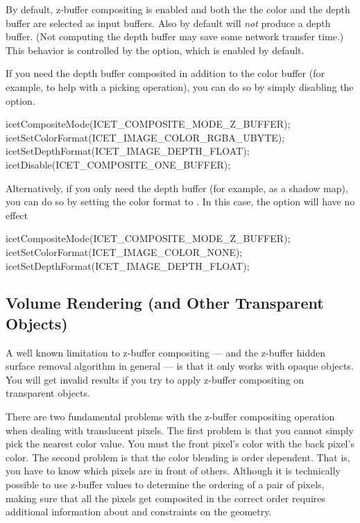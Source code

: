 By default, z-buffer compositing is enabled and both the the color and the
depth buffer are selected as input buffers.  Also by default \IceT will
\emph{not} produce a depth buffer.  (Not computing the depth buffer may
save some network transfer time.)  This behavior is controlled by the
 option, which is enabled by default.

If you need the depth buffer composited in addition to the color buffer
(for example, to help with a picking operation), you can do so by simply
disabling the  option.

\begin{code}
icetCompositeMode(ICET_COMPOSITE_MODE_Z_BUFFER);
icetSetColorFormat(ICET_IMAGE_COLOR_RGBA_UBYTE);
icetSetDepthFormat(ICET_IMAGE_DEPTH_FLOAT);
icetDisable(ICET_COMPOSITE_ONE_BUFFER);
\end{code}

Alternatively, if you only need the depth buffer (for example, as a shadow
map), you can do so by setting the color format to
.  In this case, the
 option will have no effect

\begin{code}
icetCompositeMode(ICET_COMPOSITE_MODE_Z_BUFFER);
icetSetColorFormat(ICET_IMAGE_COLOR_NONE);
icetSetDepthFormat(ICET_IMAGE_DEPTH_FLOAT);
\end{code}


\subsection{Volume Rendering (and Other Transparent Objects)}
\label{sec:Customizing_Compositing:Volume_Rendering}

A well known limitation to z-buffer compositing --- and the z-buffer hidden
surface removal algorithm in general --- is that it only works with opaque
objects.  You will get invalid results if you try to apply z-buffer
compositing on transparent objects.

There are two fundamental problems with the z-buffer compositing operation
when dealing with translucent pixels.  The first problem is that you cannot
simply pick the nearest color value.  You must  the front
pixel's color with the back pixel's color.  The second problem is that the
color blending is order dependent.  That is, you have to know which pixels
are in front of others.  Although it is technically possible to use
z-buffer values to determine the ordering of a pair of pixels, making sure
that all the pixels get composited in the correct order requires additional
information about and constraints on the geometry.

